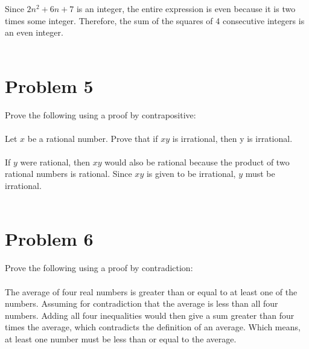 \documentclass{amsart}
\theoremstyle{definition}
\theoremstyle{Exercise}
\theoremstyle{remark}
\theoremstyle{rule}
\numberwithin{equation}{section}
\begin{document}
Since \(2n^2 + 6n + 7\) is an integer, the entire expression is even because it is two times some integer. Therefore, the sum of the squares of 4 consecutive integers is an even integer.
\\\\


 \newpage
\section*{Problem 5}

Prove the following using a proof by contrapositive:
\\\\

Let $x$ be a rational number. Prove that if $xy$ is irrational, then y is irrational.\\\\
If \( y \) were rational, then \( xy \) would also be rational because the product of two rational numbers is rational. Since \( xy \) is given to be irrational, \( y \) must be irrational.
\\\\




 \newpage

\section*{Problem 6}
Prove the following using a proof by contradiction:
\\\\


The average of four real numbers is greater than or equal to at least one of the numbers.
Assuming for contradiction that the average is less than all four numbers. Adding all four inequalities would then give a sum greater than four times the average, which contradicts the definition of an average. Which means, at least one number must be less than or equal to the average.
\\\\



 \newpage
\end{document}
